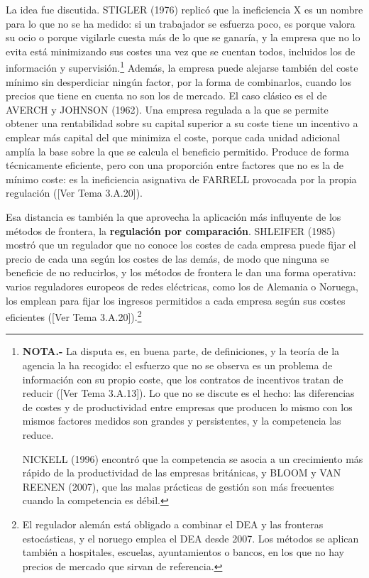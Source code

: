\documentclass[10pt,a4paper]{article}
\newcommand{\authorfont}[1]{{\fontfamily{EBGaramond-TLF}\selectfont #1}}
\begin{document}
La idea fue discutida. STIGLER (1976) replicó que la ineficiencia X es un nombre para lo que no se ha medido: si un trabajador se esfuerza poco, es porque valora su ocio o porque vigilarle cuesta más de lo que se ganaría, y la empresa que no lo evita está minimizando sus costes una vez que se cuentan todos, incluidos los de información y supervisión.\footnote{%
    \textbf{NOTA.-} La disputa es, en buena parte, de definiciones, y la teoría de la agencia la ha recogido: el esfuerzo que no se observa es un problema de información con su propio coste, que los contratos de incentivos tratan de reducir ([\authorfont{Ver Tema 3.A.13}]). Lo que no se discute es el hecho: las diferencias de costes y de productividad entre empresas que producen lo mismo con los mismos factores medidos son grandes y persistentes, y la competencia las reduce.

    NICKELL (1996) encontró que la competencia se asocia a un crecimiento más rápido de la productividad de las empresas británicas, y BLOOM y VAN REENEN (2007), que las malas prácticas de gestión son más frecuentes cuando la competencia es débil.
} Además, la empresa puede alejarse también del coste mínimo sin desperdiciar ningún factor, por la forma de combinarlos, cuando los precios que tiene en cuenta no son los de mercado. El caso clásico es el de AVERCH y JOHNSON (1962). Una empresa regulada a la que se permite obtener una rentabilidad sobre su capital superior a su coste tiene un incentivo a emplear más capital del que minimiza el coste, porque cada unidad adicional amplía la base sobre la que se calcula el beneficio permitido. Produce de forma técnicamente eficiente, pero con una proporción entre factores que no es la de mínimo coste: es la ineficiencia asignativa de FARRELL provocada por la propia regulación ([\authorfont{Ver Tema 3.A.20}]).

Esa distancia es también la que aprovecha la aplicación más influyente de los métodos de frontera, la \textbf{regulación por comparación}. SHLEIFER (1985) mostró que un regulador que no conoce los costes de cada empresa puede fijar el precio de cada una según los costes de las demás, de modo que ninguna se beneficie de no reducirlos, y los métodos de frontera le dan una forma operativa: varios reguladores europeos de redes eléctricas, como los de Alemania o Noruega, los emplean para fijar los ingresos permitidos a cada empresa según sus costes eficientes ([\authorfont{Ver Tema 3.A.20}]).\footnote{%
    El regulador alemán está obligado a combinar el DEA y las fronteras estocásticas, y el noruego emplea el DEA desde 2007. Los métodos se aplican también a hospitales, escuelas, ayuntamientos o bancos, en los que no hay precios de mercado que sirvan de referencia.
}
\end{document}

